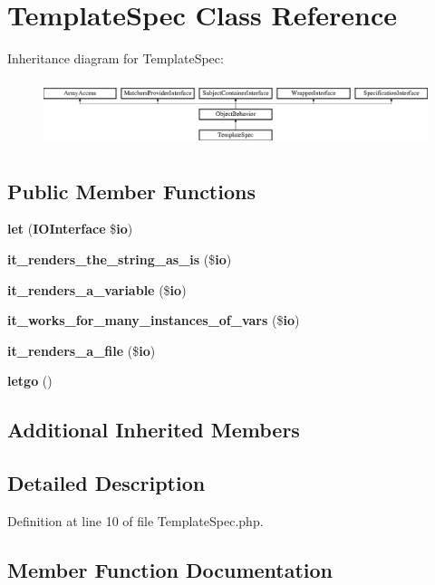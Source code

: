 \section{Template\+Spec Class Reference}
\label{classspec_1_1_php_spec_1_1_formatter_1_1_html_1_1_template_spec}
Inheritance diagram for Template\+Spec\+:\begin{figure}[H]
\begin{center}
\leavevmode
\includegraphics[height=1.953488cm]{classspec_1_1_php_spec_1_1_formatter_1_1_html_1_1_template_spec}
\end{center}
\end{figure}
\subsection*{Public Member Functions}
\begin{DoxyCompactItemize}
\item 
{\bf let} ({\bf I\+O\+Interface} \${\bf io})
\item 
{\bf it\+\_\+renders\+\_\+the\+\_\+string\+\_\+as\+\_\+is} (\${\bf io})
\item 
{\bf it\+\_\+renders\+\_\+a\+\_\+variable} (\${\bf io})
\item 
{\bf it\+\_\+works\+\_\+for\+\_\+many\+\_\+instances\+\_\+of\+\_\+vars} (\${\bf io})
\item 
{\bf it\+\_\+renders\+\_\+a\+\_\+file} (\${\bf io})
\item 
{\bf letgo} ()
\end{DoxyCompactItemize}
\subsection*{Additional Inherited Members}


\subsection{Detailed Description}


Definition at line 10 of file Template\+Spec.\+php.



\subsection{Member Function Documentation}
